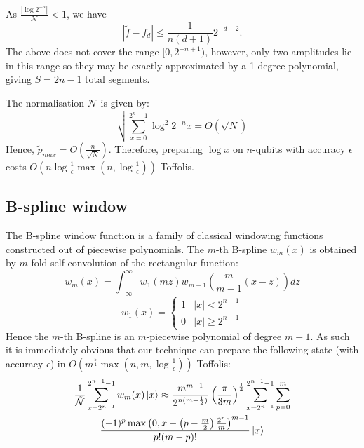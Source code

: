 \documentclass[aps,prx,twocolumn,floatfix,10pt,amssymb,amsfont,amsmath,superscriptaddress,float,nofootinbib,longbibliography,nobalancelastpage]{revtex4-2}
\theoremstyle{empty}
\begin{document}
As $\frac{|\log 2^{-n}|}{\mathcal{N}} < 1$, we have
\begin{equation}
    |\tilde f - f_{d}| \leq  \frac{1}{n(d+1)} 2^{-d-2}.
\end{equation}
The above does not cover the range $[0, 2^{-n+1})$, however, only two amplitudes lie in this range so they may be exactly approximated by a 1-degree polynomial, giving $S=2n-1$ total segments.

The normalisation $\mathcal{N}$ is given by:
\begin{equation}
    \sqrt{\sum_{x=0}^{2^n-1}\log^2 2^{-n} x} = O\left(\sqrt{N}\right)
\end{equation}
Hence, $\tilde{p}_{max} = O\left(\frac{n}{\sqrt{N}}\right)$. Therefore, preparing $\log{x}$ on $n$-qubits with accuracy $\epsilon$ costs $O(n \log \frac{1}{\epsilon}\max(n, \log\frac{1}{\epsilon}))$ Toffolis. 

\subsection{B-spline window}
\label{section:b_spline}
  The B-spline window function \cite{bspline} is a family of classical windowing functions constructed out of piecewise polynomials. The $m$-th B-spline $w_m(x)$ is obtained by $m$-fold self-convolution of the rectangular function:
  \begin{equation}
  \label{eq:self_conv}
      w_m(x) = \int_{-\infty}^{\infty} w_1(m z) w_{m-1}\left(\frac{m}{m-1}(x-z)\right) dz
  \end{equation}
  \begin{equation}
      w_1(x) = \begin{cases}
          1 & |x| < 2^{n-1}\\
          0 & |x| \geq 2^{n-1}
      \end{cases}
  \end{equation}
  Hence the $m$-th B-spline is an $m$-piecewise polynomial of degree $m-1$. As such it is immediately obvious that our technique can prepare the following state (with accuracy $\epsilon$) in $O(m^{\frac{5}{4}}\max(n,m, \log \frac{1}{\epsilon}))$ Toffolis:
  \begin{multline}
      \frac{1}{\mathcal{\tilde N}}\sum_{x=2^{n-1}}^{2^{n-1} -1} w_m(x)\ket{x} \approx \frac{m^{m+1}}{2^{n(m-\frac{1}{2})}}\left(\frac{\pi}{3m}\right)^{\frac{1}{4}}\sum_{x=2^{n-1}}^{2^{n -1}-1}\sum_{p=0}^m\\   \frac{(-1)^p \max\left(0,x - \left(p-\frac{m}{2}\right)\frac{2^n}{m}\right)^{m-1}}{p!(m-p)!}\ket{x}
  \end{multline}
  
\end{document}
